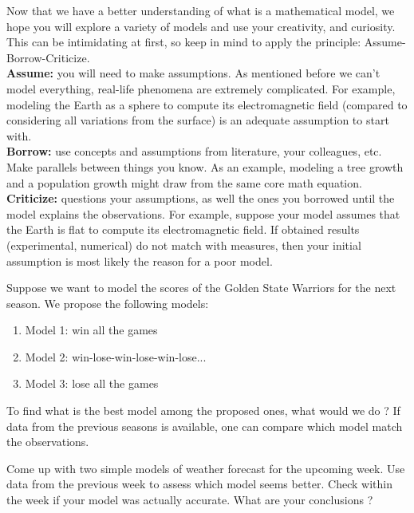 Now that we have a better understanding of what is a mathematical model, we hope you will explore a variety of models and use your creativity, and curiosity. This can be intimidating at first, so keep in mind to apply the principle: Assume-Borrow-Criticize.\\
\textbf{Assume: }you will need to make assumptions. As mentioned before we can't model everything, real-life phenomena are extremely complicated. For example, modeling the Earth as a sphere to compute its electromagnetic field (compared to considering all variations from the surface) is an adequate assumption to start with. \\
\textbf{Borrow: }use concepts and assumptions from literature, your colleagues, etc. Make parallels between things you know. As an example, modeling a tree growth and a population growth might draw from the same core math equation.\\
\textbf{Criticize: }questions your assumptions, as well the ones you borrowed until the model explains the observations. For example, suppose your model assumes that the Earth is flat to compute its electromagnetic field. If obtained results (experimental, numerical) do not match with measures, then your initial assumption is most likely the reason for a poor model.

\begin{Example}
Suppose we want to model the scores of the Golden State Warriors for the next season. We propose the following models:
\begin{enumerate}
\item Model 1: win all the games
\item Model 2: win-lose-win-lose-win-lose...
\item Model 3: lose all the games
\end{enumerate}
To find what is the best model among the proposed ones, what would we do ? If data from the previous seasons is available, one can compare which model match the observations. 
\end{Example}
\begin{Exercise}
Come up with two simple models of weather forecast for the upcoming week. Use data from the previous week to assess which model seems better. Check within the week if your model was actually accurate. What are your conclusions ?

\dotfill

\dotfill

\dotfill

\dotfill

\dotfill

\dotfill

\dotfill

\dotfill

\dotfill

\dotfill
\end{Exercise}


